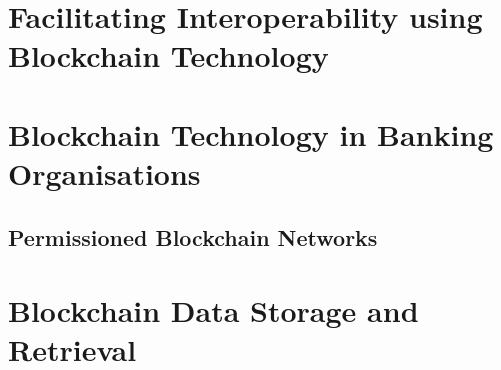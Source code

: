 \section{Facilitating Interoperability using Blockchain Technology}

\section{Blockchain Technology in Banking Organisations}

\subsection{Permissioned Blockchain Networks}

\section{Blockchain Data Storage and Retrieval}